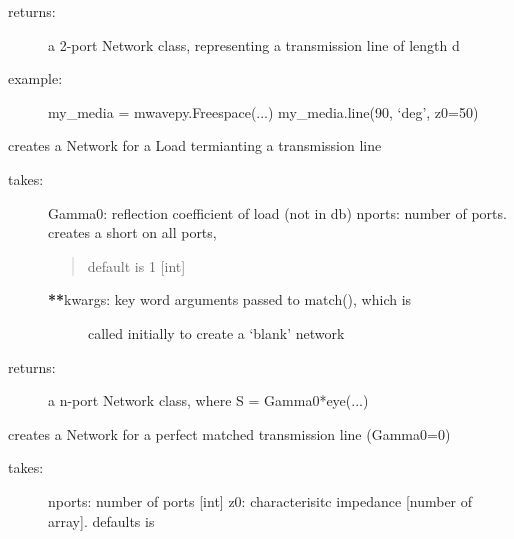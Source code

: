 \documentclass[letterpaper,10pt,english]{sphinxmanual}
\begin{document}
\begin{fulllineitems}
\begin{fulllineitems}
\begin{description}
\begin{description}
\end{description}

\item[{returns:}] \leavevmode
a 2-port Network class, representing a transmission line of 
length d

\item[{example:}] \leavevmode
my\_media = mwavepy.Freespace(...)
my\_media.line(90, `deg', z0=50)

\end{description}

\end{fulllineitems}


\begin{fulllineitems}
\label{api/mwavepy.media:mwavepy.media.media.Media.load}
creates a Network for a Load termianting a transmission line
\begin{description}
\item[{takes:}] \leavevmode
Gamma0: reflection coefficient of load (not in db)
nports: number of ports. creates a short on all ports,
\begin{quote}

default is 1 {[}int{]}
\end{quote}
\begin{description}
\item[{{\color{red}\bfseries{}**}kwargs: key word arguments passed to match(), which is }] \leavevmode
called initially to create a `blank' network

\end{description}

\item[{returns:}] \leavevmode
a n-port Network class, where  S = Gamma0*eye(...)

\end{description}

\end{fulllineitems}


\begin{fulllineitems}
\label{api/mwavepy.media:mwavepy.media.media.Media.match}
creates a Network for a perfect matched transmission line (Gamma0=0)
\begin{description}
\item[{takes:}] \leavevmode
nports: number of ports {[}int{]}
z0: characterisitc impedance {[}number of array{]}. defaults is
\begin{quote}


\end{quote}
\end{description}
\end{fulllineitems}
\end{fulllineitems}
\end{document}
